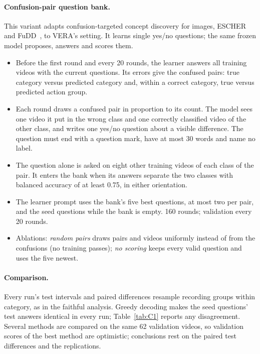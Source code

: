 \paragraph{Confusion-pair question bank.} This variant adapts confusion-targeted concept discovery for images, ESCHER~\cite{sehgal2025escher} and FuDD~\cite{esfandiarpoor2024fudd}, to VERA's setting. It learns single yes/no questions; the same frozen model proposes, answers and scores them.
\begin{itemize}
\item Before the first round and every 20 rounds, the learner answers all training videos with the current questions. Its errors give the confused pairs: true category versus predicted category and, within a correct category, true versus predicted action group.
\item Each round draws a confused pair in proportion to its count. The model sees one video it put in the wrong class and one correctly classified video of the other class, and writes one yes/no question about a visible difference. The question must end with a question mark, have at most 30 words and name no label.
\item The question alone is asked on eight other training videos of each class of the pair. It enters the bank when its answers separate the two classes with balanced accuracy of at least 0.75, in either orientation.
\item The learner prompt uses the bank's five best questions, at most two per pair, and the seed questions while the bank is empty. 160 rounds; validation every 20 rounds.
\item Ablations: \emph{random pairs} draws pairs and videos uniformly instead of from the confusions (no training passes); \emph{no scoring} keeps every valid question and uses the five newest.
\end{itemize}

\paragraph{Comparison.} Every run's test intervals and paired differences resample recording groups within category, as in the faithful analysis. Greedy decoding makes the seed questions' test answers identical in every run; Table~\ref{tab:C1} reports any disagreement. Several methods are compared on the same 62 validation videos, so validation scores of the best method are optimistic; conclusions rest on the paired test differences and the replications.

